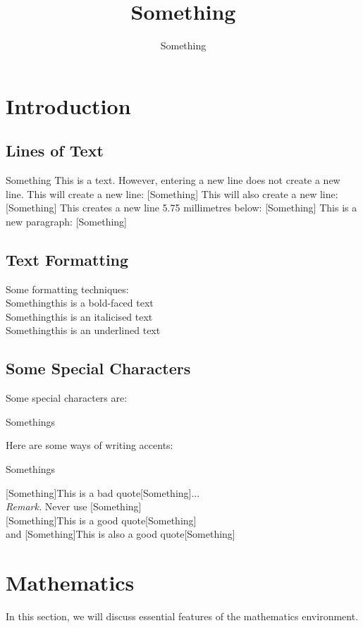\documentclass{article}
\title{Something}
\date{}
\author{Something}
\begin{document}
	\section{Introduction}
		\subsection{Lines of Text}
			Something This is a text. However,
			entering
			a 
			new line
			does not create a new line. 
			This will create a new line: [Something]
			This will also create a new line: [Something]
			This creates a new line 5.75 millimetres below:	[Something]
			This is a new paragraph: 
			[Something]
		\subsection{Text Formatting}
			Some formatting techniques:\\[3mm]
			Something{this is a bold-faced text}\\[3mm]
			Something{this is an italicised text}\\[3mm]
			Something{this is an underlined text}\\[3mm]
		\subsection{Some Special Characters}
			Some special characters are:
			\begin{center}
				Somethings
			\end{center}
			Here are some ways of writing accents:			
			\begin{center}
				Somethings
			\end{center}
			[Something]This is a bad quote[Something]...\\[3mm]
			\emph{Remark.} Never use [Something]\\[3mm]
			[Something]This is a good quote[Something]\\
			and [Something]This is also a good quote[Something]
	\section{Mathematics}
		In this section, we will discuss essential features of the mathematics environment.
\end{document}
